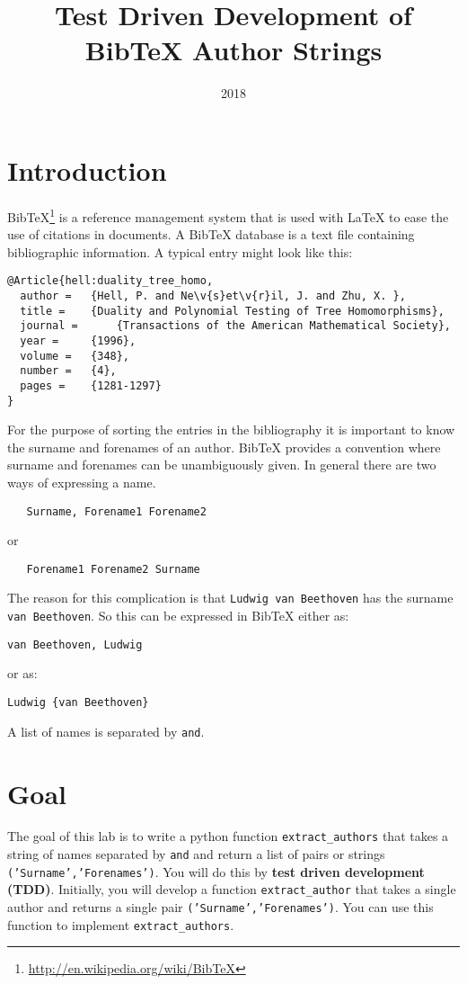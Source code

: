 \documentclass[10pt]{paper}
\title{Test Driven Development of Bib\TeX{} Author Strings}
\date{2018}
\begin{document}
\maketitle
\section*{Introduction}
Bib\TeX\footnote{\url{http://en.wikipedia.org/wiki/BibTeX}} is a
reference management system that is used with La\TeX{} to ease the use
of citations in documents. A Bib\TeX{} database is a text file
containing bibliographic information. A typical entry might look like this:
\begin{verbatim}
@Article{hell:duality_tree_homo,
  author = 	 {Hell, P. and Ne\v{s}et\v{r}il, J. and Zhu, X. },
  title = 	 {Duality and Polynomial Testing of Tree Homomorphisms},
  journal = 	 {Transactions of the American Mathematical Society},
  year = 	 {1996},
  volume =	 {348},
  number =	 {4},
  pages =	 {1281-1297}
}
\end{verbatim}

For the purpose of sorting the entries in the bibliography it is
important to know the surname and forenames of an author. Bib\TeX{}
provides a convention where surname and forenames can be unambiguously
given. In general there are two ways of expressing a name.
\begin{verbatim}
   Surname, Forename1 Forename2
\end{verbatim}
or
\begin{verbatim}
   Forename1 Forename2 Surname
\end{verbatim}
The reason for this complication is that {\tt Ludwig van Beethoven}
has the surname {\tt van Beethoven}. So this can be expressed in
Bib\TeX{} either as: 
\begin{verbatim}
van Beethoven, Ludwig
\end{verbatim}
or as: 
\begin{verbatim}
Ludwig {van Beethoven}
\end{verbatim}

A list of names is separated by {\tt and}. 

\section*{Goal}
The goal of this lab is to write a python function \texttt {extract\_authors}
that takes a string of names separated by \texttt{and}
and return a list of pairs or strings \texttt{('Surname','Forenames')}. You will do this by \textbf{test driven development (TDD)}. 
Initially, you will develop a function \texttt{extract\_author} that 
takes a single author and returns a single pair \texttt{('Surname','Forenames')}.  
You can use this function to implement \texttt{extract\_authors}.
\end{document}
